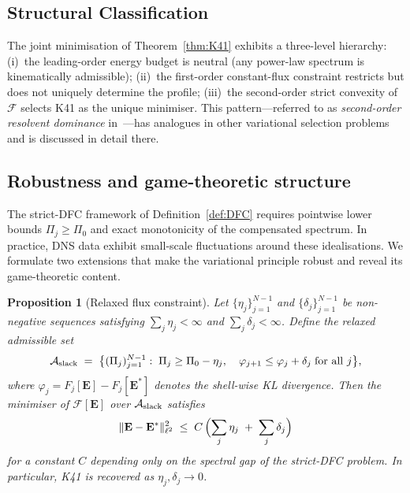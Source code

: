 \documentclass[12pt,a4paper]{article}
\theoremstyle{definition}
\theoremstyle{plain}
\newtheorem{proposition}[definition]{Proposition}
\theoremstyle{remark}
\begin{document}
\subsection{Structural Classification}\label{sec:resolvent-cascade}

The joint minimisation of Theorem~\ref{thm:K41} exhibits a three-level
hierarchy: (i)~the leading-order energy budget is neutral (any power-law
spectrum is kinematically admissible); (ii)~the first-order constant-flux
constraint restricts but does not uniquely determine the profile;
(iii)~the second-order strict convexity of~$\mathcal{F}$ selects K41 as
the unique minimiser.  This pattern---referred to as
\emph{second-order resolvent dominance} in~\cite{FST-Unified2026}---has
analogues in other variational selection problems and is discussed in
detail there.

\subsection{Robustness and game-theoretic structure}\label{sec:robustness}

The strict-DFC framework of Definition~\ref{def:DFC} requires
pointwise lower bounds $\Pi_j \ge \Pi_0$ and exact monotonicity of the
compensated spectrum.  In practice, DNS data exhibit small-scale
fluctuations around these idealisations.  We formulate two extensions
that make the variational principle robust and reveal its game-theoretic
content.

\begin{proposition}[Relaxed flux constraint]
\label{prop:dfc-slack}
Let $\{\eta_j\}_{j=1}^{N-1}$ and $\{\delta_j\}_{j=1}^{N-1}$ be
non-negative sequences satisfying $\sum_j \eta_j < \infty$ and
$\sum_j \delta_j < \infty$.  Define the \emph{relaxed admissible set}
\[
  \mathcal{A}_{\textup{slack}}
  \;=\;
  \bigl\{
    (\Pi_j)_{j=1}^{N-1} :\;
    \Pi_j \ge \Pi_0 - \eta_j,\quad
    \varphi_{j+1} \le \varphi_j + \delta_j
    \;\text{for all } j
  \bigr\},
\]
where $\varphi_j = F_j[\mathbf{E}] - F_j[\mathbf{E}^*]$ denotes the
shell-wise KL divergence.  Then the minimiser of
$\mathcal{F}[\mathbf{E}]$ over $\mathcal{A}_{\textup{slack}}$
satisfies
\begin{equation}\label{eq:dfc-slack-bound}
  \|\mathbf{E} - \mathbf{E}^*\|_{\ell^2}^2
  \;\le\;
  C\,\Bigl(\sum_j \eta_j \;+\; \sum_j \delta_j\Bigr)
\end{equation}
for a constant $C$ depending only on the spectral gap of the
strict-DFC problem.  In particular, K41 is recovered as
$\eta_j, \delta_j \to 0$.
\end{proposition}
\end{document}
